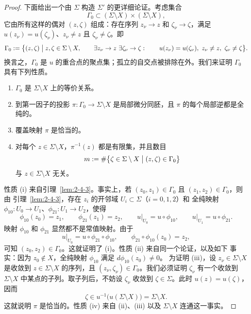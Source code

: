 \begin{proof}
下面给出一个由 $\Sigma$ 构造 $\Sigma'$ 的更详细论证。考虑集合
\[
  \Gamma_0\subset(\Sigma\setminus X)\times(\Sigma\setminus X),
\]
它由所有这样的偶对 $(z,\zeta)$ 组成：存在序列 $z_\nu\to z$ 和
$\zeta_\nu\to\zeta$，满足
$u(z_\nu)=u(\zeta_\nu)$、$z_\nu\ne z$ 且 $\zeta_\nu\ne\zeta$。即
\[
  \Gamma_0:=\bigl\{(z,\zeta)\bigm|
  z,\zeta\in\Sigma\setminus X,\qquad
  \exists z_\nu\to z\ \exists\zeta_\nu\to\zeta:\qquad
  u(z_\nu)=u(\zeta_\nu),\ z_\nu\ne z,\ \zeta_\nu\ne\zeta\bigr\}.
\]
换言之，$\Gamma_0$ 是 $u$ 的重合点的聚点集；孤立的自交点被排除在外。我们来证明
$\Gamma_0$ 具有下列性质。
\begin{enumerate}[label=\textup{(\roman*)}]
  \item $\Gamma_0$ 是 $\Sigma\setminus X$ 上的等价关系。
  \item 到第一因子的投影 $\pi:\Gamma_0\to\Sigma\setminus X$ 是局部微分同胚，且
  $\pi$ 的每个局部逆都是全纯的。
  \item 覆盖映射 $\pi$ 是恰当的。
  \item 对每个 $z\in\Sigma\setminus X$，$\pi^{-1}(z)$ 都是有限集，并且数目
  \[
    m:=\#\bigl\{\zeta\in\Sigma\setminus X\bigm|(z,\zeta)\in\Gamma_0\bigr\}
  \]
  与 $z\in\Sigma\setminus X$ 无关。
\end{enumerate}

性质 (i) 来自引理~\ref{lem:2-4-3}。事实上，若
$(z_0,z_1)\in\Gamma_0$ 且 $(z_1,z_2)\in\Gamma_0$，则由
引理~\ref{lem:2-4-3}，存在 $z_i$ 的开邻域 $U_i\subset\Sigma$（$i=0,1,2$）和
全纯映射 $\phi_{10}:U_0\to U_1$、$\phi_{21}:U_1\to U_2$，使得
\[
  \phi_{10}(z_0)=z_1,
  \qquad
  \phi_{21}(z_1)=z_2,
  \qquad
  \left.u\right|_{U_0}=u\circ\phi_{10},
  \qquad
  \left.u\right|_{U_1}=u\circ\phi_{21}.
\]
映射 $\phi_{10}$ 和 $\phi_{21}$ 显然都不是常值映射。由于
\[
  \left.u\right|_{U_0}=u\circ\phi_{21}\circ\phi_{10},
  \qquad
  \phi_{21}\circ\phi_{10}(z_0)=z_2,
\]
可知 $(z_0,z_2)\in\Gamma_0$。这就证明了 (i)。性质 (ii) 来自同一个论证，以及如下
事实：因为 $z_0\notin X$，全纯映射 $\phi_{10}$ 满足 $d\phi_{10}(z_0)\ne0$。
为证明 (iii)，设 $z_\nu\in\Sigma\setminus X$ 是收敛到
$z\in\Sigma\setminus X$ 的序列，且 $(z_\nu,\zeta_\nu)\in\Gamma_0$。我们必须证明
$\zeta_\nu$ 有一个收敛到 $\Sigma\setminus X$ 中某点的子列。取子列后，不妨设
$\zeta_\nu$ 收敛到 $\zeta\in\Sigma$。此时 $u(z)=u(\zeta)$，因而
\[
  \zeta\in u^{-1}\bigl(u(\Sigma\setminus X)\bigr)=\Sigma\setminus X.
\]
这就说明 $\pi$ 是恰当的。性质 (iv) 来自 (ii)、(iii) 以及
$\Sigma\setminus X$ 连通这一事实。


\end{proof}
